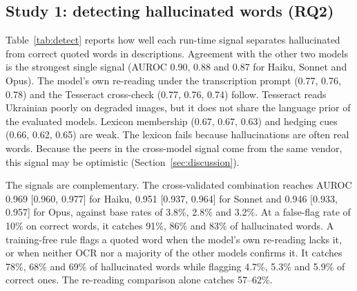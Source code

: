 \documentclass[pdflatex,sn-mathphys-num]{sn-jnl}%
\theoremstyle{thmstyleone}%
\theoremstyle{thmstyletwo}%
\theoremstyle{thmstylethree}%
\newcommand{\AucCombCIHaiku}{0.969 [0.960, 0.977]}
\newcommand{\AucCombCIOpus}{0.946 [0.933, 0.957]}
\newcommand{\AucCombCISonnet}{0.951 [0.937, 0.964]}
\newcommand{\AucHedgeHaiku}{0.66}
\newcommand{\AucHedgeOpus}{0.65}
\newcommand{\AucHedgeSonnet}{0.62}
\newcommand{\AucLexHaiku}{0.67}
\newcommand{\AucLexOpus}{0.63}
\newcommand{\AucLexSonnet}{0.67}
\newcommand{\AucOcrHaiku}{0.77}
\newcommand{\AucOcrOpus}{0.74}
\newcommand{\AucOcrSonnet}{0.76}
\newcommand{\AucRereadHaiku}{0.77}
\newcommand{\AucRereadOpus}{0.78}
\newcommand{\AucRereadSonnet}{0.76}
\newcommand{\AucXmodelHaiku}{0.90}
\newcommand{\AucXmodelOpus}{0.87}
\newcommand{\AucXmodelSonnet}{0.88}
\newcommand{\BaseHaiku}{3.8}
\newcommand{\BaseOpus}{3.2}
\newcommand{\BaseSonnet}{2.8}
\newcommand{\RangeRereadRec}{57--62}
\newcommand{\RecTenHaiku}{91}
\newcommand{\RecTenOpus}{83}
\newcommand{\RecTenSonnet}{86}
\newcommand{\RuleFfHaiku}{4.7}
\newcommand{\RuleFfOpus}{5.9}
\newcommand{\RuleFfSonnet}{5.3}
\newcommand{\RuleRecHaiku}{78}
\newcommand{\RuleRecOpus}{69}
\newcommand{\RuleRecSonnet}{68}
\begin{document}
\subsection{Study 1: detecting hallucinated words (RQ2)}\label{sec:rq2}

Table~\ref{tab:detect} reports how well each run-time signal separates hallucinated from correct quoted words in descriptions. Agreement with the other two models is the strongest single signal (AUROC \AucXmodelHaiku, \AucXmodelSonnet{} and \AucXmodelOpus{} for Haiku, Sonnet and Opus). The model's own re-reading under the transcription prompt (\AucRereadHaiku, \AucRereadSonnet, \AucRereadOpus) and the Tesseract cross-check (\AucOcrHaiku, \AucOcrSonnet, \AucOcrOpus) follow. Tesseract reads Ukrainian poorly on degraded images, but it does not share the language prior of the evaluated models. Lexicon membership (\AucLexHaiku, \AucLexSonnet, \AucLexOpus) and hedging cues (\AucHedgeHaiku, \AucHedgeSonnet, \AucHedgeOpus) are weak. The lexicon fails because hallucinations are often real words. Because the peers in the cross-model signal come from the same vendor, this signal may be optimistic (Section~\ref{sec:discussion}).

The signals are complementary. The cross-validated combination reaches AUROC \AucCombCIHaiku{} for Haiku, \AucCombCISonnet{} for Sonnet and \AucCombCIOpus{} for Opus, against base rates of \BaseHaiku\%, \BaseSonnet\% and \BaseOpus\%. At a false-flag rate of 10\% on correct words, it catches \RecTenHaiku\%, \RecTenSonnet\% and \RecTenOpus\% of hallucinated words. A training-free rule flags a quoted word when the model's own re-reading lacks it, or when neither OCR nor a majority of the other models confirms it. It catches \RuleRecHaiku\%, \RuleRecSonnet\% and \RuleRecOpus\% of hallucinated words while flagging \RuleFfHaiku\%, \RuleFfSonnet\% and \RuleFfOpus\% of correct ones. The re-reading comparison alone catches \RangeRereadRec\%.
\end{document}
